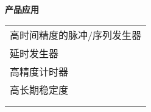 \vspace{1cm}
\noindent\sanhao\textbf{产品应用}
\vspace{0.3cm}
\song
\begin{table}[H]
{}
\begin{tabular}{m{13.5cm}}
\rowcolor{gray!20}
\arrayrulecolor{tabcolor_top}\toprule[1.8pt]
高时间精度的脉冲/序列发生器\\\arrayrulecolor{tabcolor}\midrule[1.2pt]
延时发生器 \\\arrayrulecolor{tabcolor}\midrule[1.2pt]
高精度计时器\\\arrayrulecolor{tabcolor}\midrule[1.2pt]
高长期稳定度\\\arrayrulecolor{tabcolor}\midrule[1.2pt]\\
\arrayrulecolor{tabcolor_top}\bottomrule[1.8pt]
\end{tabular}
\end{table}


